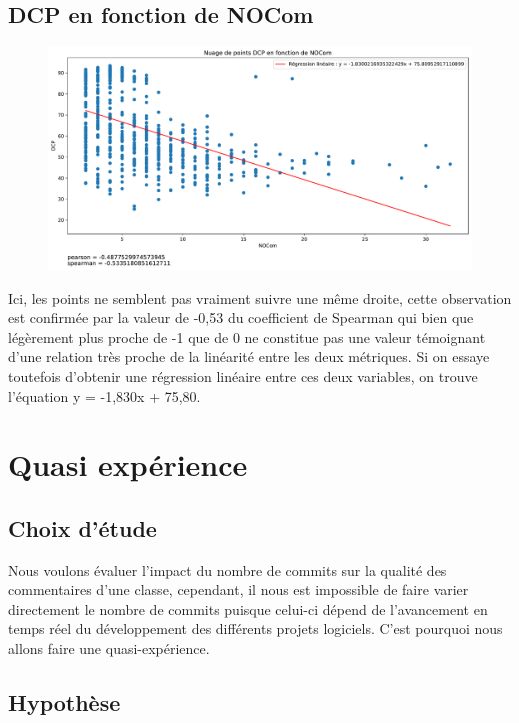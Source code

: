 \documentclass[11pt]{rapport-tp-qlm}
\begin{document}
    \section{DCP en fonction de NOCom}
 
    \begin{figure}[h]
    \includegraphics[scale=0.5]{assets/relation_DCP_NOCom}
    \centering
    \end{figure}

Ici, les points ne semblent pas vraiment suivre une même droite, cette observation est confirmée par la valeur de -0,53 du coefficient de Spearman qui bien que légèrement plus proche de -1 que de 0 ne constitue pas une valeur témoignant d'une relation très proche de la linéarité entre les deux métriques. Si on essaye toutefois d'obtenir une régression linéaire entre ces deux variables, on trouve l'équation y = -1,830x + 75,80.
    
\chapter{Quasi expérience}

\section{Choix d'étude}
Nous voulons évaluer l'impact du nombre de commits sur la qualité des commentaires d'une classe, cependant, il nous est impossible de faire varier directement le nombre de commits puisque celui-ci dépend de l'avancement en temps réel du développement des différents projets logiciels. C'est pourquoi nous allons faire une quasi-expérience.


\section{Hypothèse}
\end{document}
